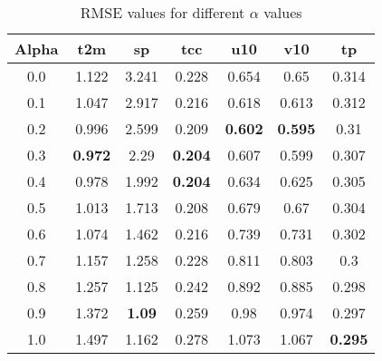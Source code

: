 \begin{table}[htbp]
    \centering
    \begin{tabular}{ccccccc}
        \toprule
        Alpha & t2m & sp & tcc & u10 & v10 & tp \\
        \midrule
        0.0 & 1.122 & 3.241 & 0.228 & 0.654 & 0.65 & 0.314 \\
        0.1 & 1.047 & 2.917 & 0.216 & 0.618 & 0.613 & 0.312 \\
        0.2 & 0.996 & 2.599 & 0.209 & \textbf{0.602} & \textbf{0.595} & 0.31 \\
        0.3 & \textbf{0.972} & 2.29 & \textbf{0.204} & 0.607 & 0.599 & 0.307 \\
        0.4 & 0.978 & 1.992 & \textbf{0.204} & 0.634 & 0.625 & 0.305 \\
        0.5 & 1.013 & 1.713 & 0.208 & 0.679 & 0.67 & 0.304 \\
        0.6 & 1.074 & 1.462 & 0.216 & 0.739 & 0.731 & 0.302 \\
        0.7 & 1.157 & 1.258 & 0.228 & 0.811 & 0.803 & 0.3 \\
        0.8 & 1.257 & 1.125 & 0.242 & 0.892 & 0.885 & 0.298 \\
        0.9 & 1.372 & \textbf{1.09} & 0.259 & 0.98 & 0.974 & 0.297 \\
        1.0 & 1.497 & 1.162 & 0.278 & 1.073 & 1.067 & \textbf{0.295} \\
        \bottomrule
    \end{tabular}
    \caption{RMSE values for different $\alpha$ values}
    \label{tab:rmse_alpha}
\end{table}

